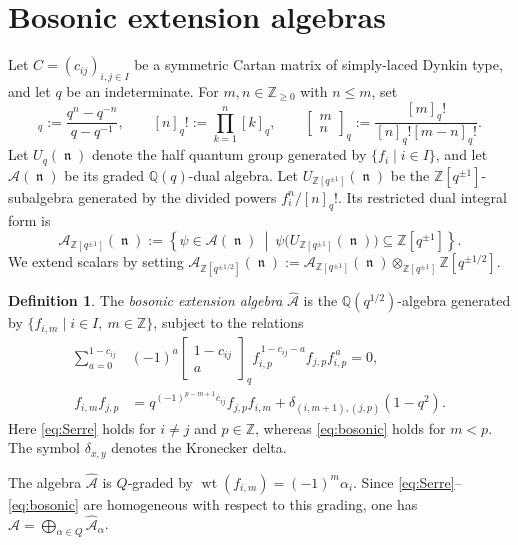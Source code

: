 \documentclass[12pt, reqno]{amsart}
\theoremstyle{plain}
\theoremstyle{definition}
\newtheorem{definition}[theorem]{Definition}
\numberwithin{equation}{section}
\newcommand{\ZZ}{\mathbb{Z}}
\newcommand{\QQ}{\mathbb{Q}}
\newcommand{\fn}{\operatorname{\mathfrak{n}}}
\newcommand{\cA}{\mathcal{A}}
\newcommand{\qbinom}[2]{\left[\begin{array}{c} #1 \\ #2 \end{array}\right]_q}
\DeclareMathOperator*{\wt}{wt}
\begin{document}
\section{Bosonic extension algebras}\label{sec:bosonic-extension}

Let \(C=(c_{ij})_{i,j\in I}\) be a symmetric Cartan matrix of simply-laced
Dynkin type, and let \(q\) be an indeterminate. For
\(m,n\in\ZZ_{\geq 0}\) with \(n\leq m\), set
\begin{equation*}
    [n]_q:=\frac{q^n-q^{-n}}{q-q^{-1}},\qquad
    [n]_q!:=\prod_{k=1}^n[k]_q,\qquad
    \qbinom{m}{n}:=\frac{[m]_q!}{[n]_q![m-n]_q!}.
\end{equation*}
Let \(U_q(\fn)\) denote the half quantum group generated by
\(\{f_i\mid i\in I\}\), and let \(\cA(\fn)\) be its graded
\(\QQ(q)\)-dual algebra. Let \(U_{\ZZ[q^{\pm1}]}(\fn)\) be the
\(\ZZ[q^{\pm1}]\)-subalgebra generated by the divided powers
\(f_i^n/[n]_q!\). Its restricted dual integral form is
\begin{equation}\label{eq:integral-form-half-quantum-group}
    \cA_{\ZZ[q^{\pm1}]}(\fn)
    :=\left\{
        \psi\in\cA(\fn)
        \ \middle|\
        \psi\bigl(U_{\ZZ[q^{\pm1}]}(\fn)\bigr)
        \subseteq\ZZ[q^{\pm1}]
      \right\}.
\end{equation}
We extend scalars by setting
\(\cA_{\ZZ[q^{\pm1/2}]}(\fn)
:=\cA_{\ZZ[q^{\pm1}]}(\fn)
\otimes_{\ZZ[q^{\pm1}]}\ZZ[q^{\pm1/2}]\).

\begin{definition}
    The \emph{bosonic extension algebra} \(\widehat{\cA}\) is the
    \(\QQ(q^{1/2})\)-algebra generated by
    \(\{f_{i,m}\mid i\in I,\ m\in\ZZ\}\), subject to the relations
    \begin{align}
        \sum_{a=0}^{1-c_{ij}}&(-1)^a
        \qbinom{1-c_{ij}}{a}
        f_{i,p}^{\,1-c_{ij}-a}f_{j,p}f_{i,p}^{\,a}
        =0,
        \label{eq:Serre}\\
        f_{i,m}f_{j,p}
        &=q^{(-1)^{p-m+1}c_{ij}}f_{j,p}f_{i,m}
        +\delta_{(i,m+1),(j,p)}(1-q^2).
        \label{eq:bosonic}
    \end{align}
    Here \eqref{eq:Serre} holds for \(i\neq j\) and \(p\in\ZZ\),
    whereas \eqref{eq:bosonic} holds for \(m<p\). The symbol
    \(\delta_{x,y}\) denotes the Kronecker delta.
\end{definition}

The algebra \(\widehat{\cA}\) is \(Q\)-graded by
\(\wt(f_{i,m})=(-1)^m\alpha_i\). Since
\eqref{eq:Serre}--\eqref{eq:bosonic} are homogeneous with respect to this
grading, one has
\(\widehat{\cA}=\bigoplus_{\alpha\in Q}\widehat{\cA}_\alpha\).
\end{document}
